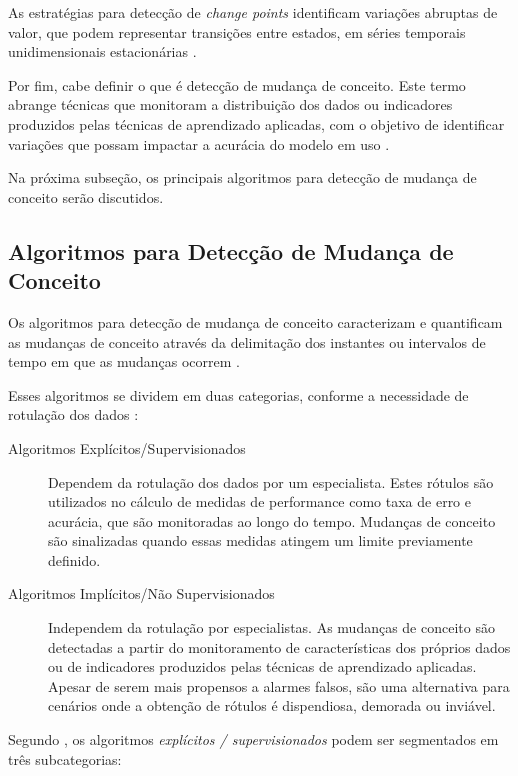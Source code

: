\documentclass[msc, classic, a4paper]{ufbathesis}
\begin{document}
As estratégias para detecção de \textit{change points} identificam variações abruptas de valor, que podem representar transições entre estados, em séries temporais unidimensionais estacionárias \cite{Aminikhanghahi:2017:SMT:3086013.3086037}.

Por fim,  cabe definir o que é detecção de mudança de conceito.
Este termo abrange técnicas que monitoram a distribuição dos dados ou indicadores produzidos pelas técnicas de aprendizado aplicadas, com o objetivo de identificar variações que possam impactar a acurácia do modelo em uso \cite{Gama:2014:SCD:2597757.2523813}.

Na próxima subseção, os principais algoritmos para detecção de mudança de conceito serão discutidos.

\subsection{Algoritmos para Detecção de Mudança de Conceito}

Os algoritmos para detecção de mudança de conceito caracterizam e quantificam as mudanças de conceito através da delimitação dos instantes ou intervalos de tempo em que as mudanças ocorrem \cite{Basseville:1993:DAC:151741}.

Esses algoritmos se dividem em duas categorias, conforme a necessidade de rotulação dos dados \cite{Zliobaite:2010}:

\begin{description}
    \item[Algoritmos Explícitos/Supervisionados] Dependem da rotulação dos dados por um especialista.
    Estes rótulos são utilizados no cálculo de medidas de performance como taxa de erro e acurácia, que são monitoradas ao longo do tempo.
    Mudanças de conceito são sinalizadas quando essas medidas atingem um limite previamente definido.

    \item[Algoritmos Implícitos/Não Supervisionados] Independem da rotulação por especialistas.
    As mudanças de conceito são detectadas a partir do monitoramento de características dos próprios dados ou de indicadores produzidos pelas técnicas de aprendizado aplicadas.
    Apesar de serem mais propensos a alarmes falsos, são uma alternativa para cenários onde a obtenção de rótulos é dispendiosa, demorada ou inviável.
\end{description}

Segundo , os algoritmos \textit{explícitos / supervisionados} podem ser segmentados em três subcategorias:
\end{document}
